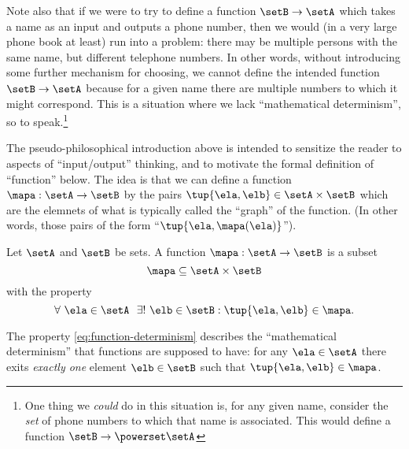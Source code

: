Note also that if we were to try to define a function $\setB \to \setA$ which takes a name as an input and outputs a phone number, then we would (in a very large phone book at least) run into a problem: there may be multiple persons with the same name, but different telephone numbers. In other words, without introducing some further mechanism for choosing, we cannot define the intended function $\setB \to \setA$ because for a given name there are multiple numbers to which it might correspond. This is a situation where we lack ``mathematical determinism'', so to speak.\footnote{One thing we \emph{could} do in this situation is, for any given name, consider the \emph{set} of phone numbers to which that name is associated. This would define a function $\setB \to \powerset \setA$}

The pseudo-philosophical introduction above is intended to sensitize the reader to aspects of ``input/output'' thinking, and to motivate the formal definition of ``function'' below. The idea is that we can define a function $\mapa: \setA \to \setB$ by the pairs $\tup{\ela, \elb} \in \setA \times \setB$ which are the elemnets of what is typically called the ``graph'' of the function. (In other words, those pairs of the form ``$\tup{\ela, \mapa(\ela)}$'').

\begin{definition}
Let $\setA$ and $\setB$ be sets. A function $\mapa: \setA \to \setB$ is a subset
\begin{equation}
\mapa \subseteq \setA \times \setB
\end{equation}
with the property 
\begin{equation}\label{eq:function-determinism}
\forall \ \ela \in \setA  \ \  \exists ! \ \elb \in \setB : \tup{\ela,\elb} \in \mapa.
\end{equation}
\end{definition}

The property \cref{eq:function-determinism} describes the ``mathematical determinism'' that functions are supposed to have: for any $\ela \in \setA$ there exits \emph{exactly one} element $\elb \in \setB$ such that $\tup{\ela, \elb} \in \mapa$. 

\clearpage
